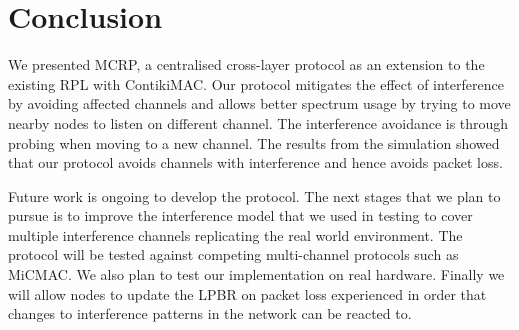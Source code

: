 \section{Conclusion}
\label{sec:conclusion}


We presented MCRP, a centralised cross-layer protocol as an extension to the existing RPL with ContikiMAC. Our protocol mitigates the effect of interference by avoiding affected channels and allows better spectrum usage by trying to move nearby nodes to listen on different channel. The interference avoidance is through probing when moving to a new channel. The results from the simulation showed that our protocol avoids channels with interference and hence avoids packet loss.

Future work is ongoing to develop the protocol. The next stages that we plan to pursue is to improve the interference model that we used in testing to cover multiple interference channels replicating the real world environment. The protocol will be tested against competing multi-channel protocols such as MiCMAC. We also plan to test our implementation on real hardware.  Finally we will allow nodes to update the LPBR on packet loss experienced in order that changes to interference patterns in the network can be reacted to.


